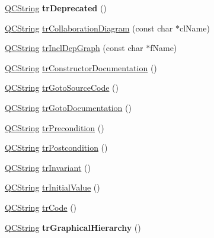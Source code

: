 \begin{DoxyCompactItemize}
\mbox{\hyperlink{class_q_c_string}{Q\+C\+String}} {\bfseries tr\+Deprecated} ()
\item 
\mbox{\hyperlink{class_q_c_string}{Q\+C\+String}} \mbox{\hyperlink{class_translator_slovene_a741a97b0516f06bc2b2c0d3c10e8e2ba}{tr\+Collaboration\+Diagram}} (const char $\ast$cl\+Name)
\item 
\mbox{\hyperlink{class_q_c_string}{Q\+C\+String}} \mbox{\hyperlink{class_translator_slovene_aa59b374f5a40cd6958dd5f24e43bed02}{tr\+Incl\+Dep\+Graph}} (const char $\ast$f\+Name)
\item 
\mbox{\hyperlink{class_q_c_string}{Q\+C\+String}} \mbox{\hyperlink{class_translator_slovene_ad2bb490e77c2125cbfc1f92b3062bdb7}{tr\+Constructor\+Documentation}} ()
\item 
\mbox{\hyperlink{class_q_c_string}{Q\+C\+String}} \mbox{\hyperlink{class_translator_slovene_aa2e818df94f36fcb503a542bf29986fe}{tr\+Goto\+Source\+Code}} ()
\item 
\mbox{\hyperlink{class_q_c_string}{Q\+C\+String}} \mbox{\hyperlink{class_translator_slovene_a10ef9490a1d8242fab815426a24ea41c}{tr\+Goto\+Documentation}} ()
\item 
\mbox{\hyperlink{class_q_c_string}{Q\+C\+String}} \mbox{\hyperlink{class_translator_slovene_a47ef8896ddf5f3b9cf3efcd64481a670}{tr\+Precondition}} ()
\item 
\mbox{\hyperlink{class_q_c_string}{Q\+C\+String}} \mbox{\hyperlink{class_translator_slovene_a4f9c88a5ce08e4ad3a12d6aa7b2cd03a}{tr\+Postcondition}} ()
\item 
\mbox{\hyperlink{class_q_c_string}{Q\+C\+String}} \mbox{\hyperlink{class_translator_slovene_aa3d5f9667fe79802a5eab427a9bea4c8}{tr\+Invariant}} ()
\item 
\mbox{\hyperlink{class_q_c_string}{Q\+C\+String}} \mbox{\hyperlink{class_translator_slovene_a32e4eae26732fe8fb615f837d6253fb7}{tr\+Initial\+Value}} ()
\item 
\mbox{\hyperlink{class_q_c_string}{Q\+C\+String}} \mbox{\hyperlink{class_translator_slovene_adc23d21c971c48973e458ffe62ea165e}{tr\+Code}} ()
\item 
\mbox{\label{class_translator_slovene_a5175a933e1744c2a370071678650ac6f}} 
\mbox{\hyperlink{class_q_c_string}{Q\+C\+String}} {\bfseries tr\+Graphical\+Hierarchy} ()
\item 
\mbox{\label{class_translator_slovene_a7c3d2fd34b708cba867b25d8b34b80c7}} 

\end{DoxyCompactItemize}
